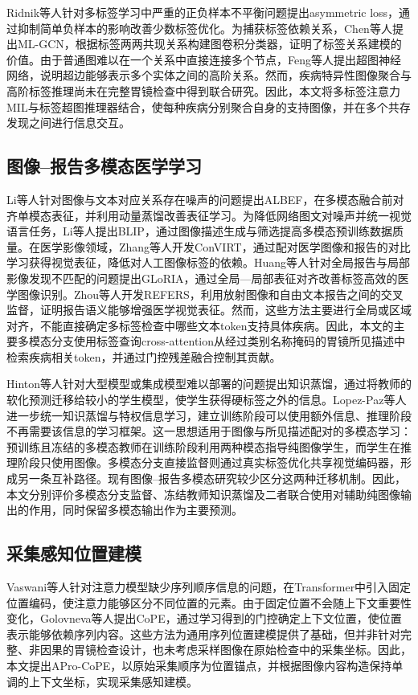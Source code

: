 \documentclass[Afour,sagev,times]{sagej}
\begin{document}
Ridnik等人针对多标签学习中严重的正负样本不平衡问题提出asymmetric loss，通过抑制简单负样本的影响改善少数标签优化。为捕获标签依赖关系，Chen等人提出ML-GCN，根据标签两两共现关系构建图卷积分类器，证明了标签关系建模的价值。由于普通图难以在一个关系中直接连接多个节点，Feng等人提出超图神经网络，说明超边能够表示多个实体之间的高阶关系。然而，疾病特异性图像聚合与高阶标签推理尚未在完整胃镜检查中得到联合研究。因此，本文将多标签注意力MIL与标签超图推理器结合，使每种疾病分别聚合自身的支持图像，并在多个共存发现之间进行信息交互。 \cite{R16} \cite{R17} \cite{R18}

\subsection{图像--报告多模态医学学习}

Li等人针对图像与文本对应关系存在噪声的问题提出ALBEF，在多模态融合前对齐单模态表征，并利用动量蒸馏改善表征学习。为降低网络图文对噪声并统一视觉语言任务，Li等人提出BLIP，通过图像描述生成与筛选提高多模态预训练数据质量。在医学影像领域，Zhang等人开发ConVIRT，通过配对医学图像和报告的对比学习获得视觉表征，降低对人工图像标签的依赖。Huang等人针对全局报告与局部影像发现不匹配的问题提出GLoRIA，通过全局—局部表征对齐改善标签高效的医学图像识别。Zhou等人开发REFERS，利用放射图像和自由文本报告之间的交叉监督，证明报告语义能够增强医学视觉表征。然而，这些方法主要进行全局或区域对齐，不能直接确定多标签检查中哪些文本token支持具体疾病。因此，本文的主要多模态分支使用标签查询cross-attention从经过类别名称掩码的胃镜所见描述中检索疾病相关token，并通过门控残差融合控制其贡献。 \cite{R19} \cite{R20} \cite{R21} \cite{R22} \cite{R23}

Hinton等人针对大型模型或集成模型难以部署的问题提出知识蒸馏，通过将教师的软化预测迁移给较小的学生模型，使学生获得硬标签之外的信息。Lopez-Paz等人进一步统一知识蒸馏与特权信息学习，建立训练阶段可以使用额外信息、推理阶段不再需要该信息的学习框架。这一思想适用于图像与所见描述配对的多模态学习：预训练且冻结的多模态教师在训练阶段利用两种模态指导纯图像学生，而学生在推理阶段只使用图像。多模态分支直接监督则通过真实标签优化共享视觉编码器，形成另一条互补路径。现有图像--报告多模态研究较少区分这两种迁移机制。因此，本文分别评价多模态分支监督、冻结教师知识蒸馏及二者联合使用对辅助纯图像输出的作用，同时保留多模态输出作为主要预测。 \cite{R24} \cite{R25}

\subsection{采集感知位置建模}

Vaswani等人针对注意力模型缺少序列顺序信息的问题，在Transformer中引入固定位置编码，使注意力能够区分不同位置的元素。由于固定位置不会随上下文重要性变化，Golovneva等人提出CoPE，通过学习得到的门控确定上下文位置，使位置表示能够依赖序列内容。这些方法为通用序列位置建模提供了基础，但并非针对完整、非因果的胃镜检查设计，也未考虑采样图像在原始检查中的采集坐标。因此，本文提出APro-CoPE，以原始采集顺序为位置锚点，并根据图像内容构造保持单调的上下文坐标，实现采集感知建模。 \cite{R26} \cite{R27}
\end{document}
